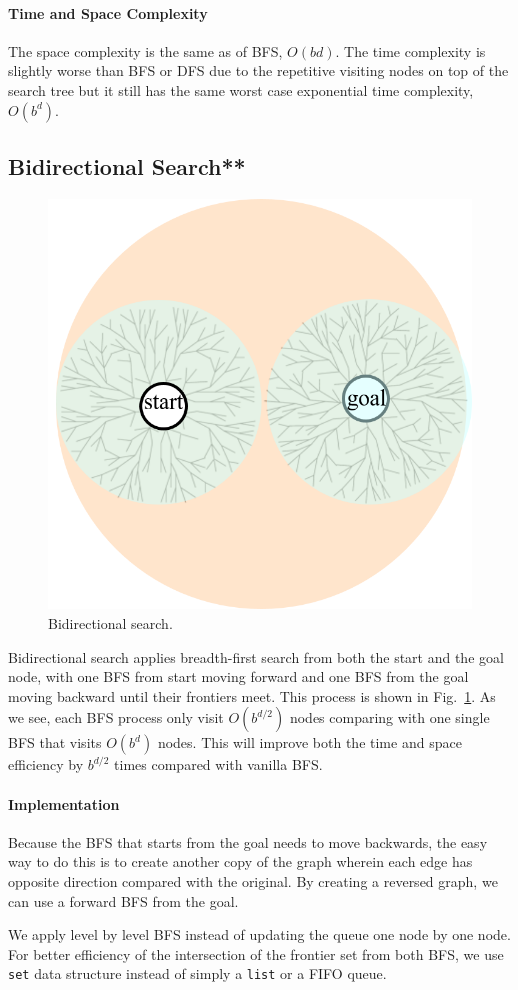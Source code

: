 \documentclass[../main.tex]{subfiles}
\begin{document}
\paragraph{Time and Space Complexity}
The space complexity is the same as of BFS, $O(bd)$. The time complexity is slightly worse than BFS or DFS due to the repetitive visiting nodes on top of the search tree but it still has the same worst case exponential time complexity, $O(b^d)$. 
\subsection{Bidirectional Search**}
\begin{figure}[!ht]
    \centering
    \includegraphics[width=0.5\columnwidth]{fig/bidrectional_search.png}
        \caption{Bidirectional search. }
    \label{fig:bidirectional_search}
\end{figure}
Bidirectional search applies breadth-first search from both the start and the goal node, with one BFS from start moving forward and one BFS from the goal moving backward until their frontiers meet. This process is shown in Fig.~\ref{fig:bidirectional_search}. As we see, each BFS process only visit $O(b^{d/2})$ nodes comparing with one single BFS that visits $O(b^d)$ nodes. This will improve both the time and space efficiency by $b^{d/2}$ times compared with vanilla BFS. 
\paragraph{Implementation} Because the BFS that starts from the goal needs to move backwards, the easy way to do this is to create another copy of the graph wherein each edge has opposite direction compared with the original. By creating a reversed graph, we can use a forward BFS from the goal. 

We apply level by level BFS instead of updating the queue one node by one node. For better efficiency of the intersection of the frontier set from both BFS, we use \texttt{set} data structure instead of simply a \texttt{list} or a FIFO queue. 
\end{document}

